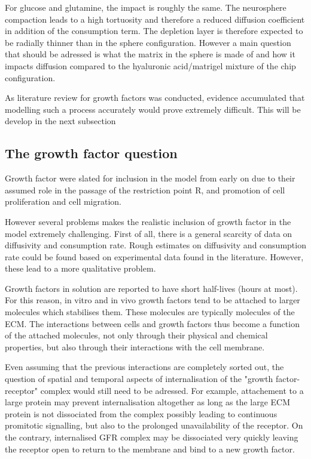 \documentclass[11pt,a4paper]{article}
\begin{document}
For glucose and glutamine, the impact is roughly the same. The neurosphere compaction leads to a high tortuosity and therefore a reduced diffusion coefficient in addition of the consumption term. The depletion layer is therefore expected to be radially thinner than in the sphere configuration. However a main question that should be adressed is what the matrix in the sphere is made of and how it impacts diffusion compared to the hyaluronic acid/matrigel mixture of the chip configuration.

As literature review for growth factors was conducted, evidence accumulated that modelling such a process accurately would prove extremely difficult. This will be develop in the next subsection

\subsection{The growth factor question}
Growth factor were slated for inclusion in the model from early on due to their assumed role in the passage of the restriction point R, and promotion of cell proliferation and cell migration.\cite{Nabil2021}\cite{Rajasekharan2009}\cite{Bauer2004}

However several problems makes the realistic inclusion of growth factor in the model extremely challenging. First of all, there is a general scarcity of data on diffusivity and consumption rate. Rough estimates on diffusivity and consumption rate could be found based on experimental data found in the literature. However, these lead to a more qualitative problem.

Growth factors in solution are reported to have short half-lives (hours at most).\cite{Ren2020}\cite{Teixeira2020} For this reason, in vitro and in vivo growth factors tend to be attached to larger molecules which stabilises them. These molecules are typically molecules of the ECM. The interactions between cells and growth factors thus become a function of the attached molecules, not only through their physical and chemical properties, but also through their interactions with the cell membrane.\cite{Teixeira2020}\cite{ChenJW2018} 

Even assuming that the previous interactions are completely sorted out, the question of spatial and temporal aspects of internalisation of the "growth factor-receptor" complex would still need to be adressed. For example, attachement to a large protein may prevent internalisation altogether as long as the large ECM protein is not dissociated from the complex possibly leading to continuous promitotic signalling, but also to the  prolonged unavailability of the receptor. On the contrary, internalised GFR complex may be dissociated very quickly leaving the receptor open to return to the membrane and bind to a new growth factor.\cite{Ren2020}\cite{Teixeira2020}
\end{document}

